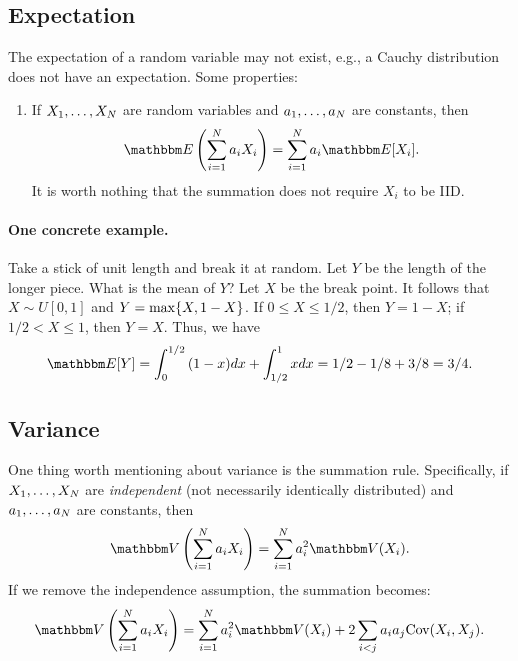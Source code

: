 \subsection{Expectation}
    The expectation of a random variable may not exist, e.g., a Cauchy distribution does not have an expectation. 
    Some properties:
        \begin{enumerate}
            \item If $X_1, \ldots, X_N$ are random variables and $a_1, \ldots, a_N$ are constants, then
                \begin{equation}
                    \E\left( \sum_{i=1}^{\ndata}{a_i X_i}\right) = \sum_{i=1}^{\ndata}{a_i \E[X_i]}.
                \end{equation}
            It is worth nothing that the summation does not require $X_i$ to be IID.
        \end{enumerate}
    \paragraph{One concrete example.} Take a stick of unit length and break it at random.
    Let $Y$ be the length of the longer piece. 
    What is the mean of $Y$?
    Let $X$ be the break point.
    It follows that $X \sim U[0, 1]$ and $Y = \max\{ X, 1- X \}$.
    If $0 \le X \le 1/2$, then $Y = 1 - X$; if $1/2 < X \le 1$, then $Y = X$.
    Thus, we have
        \begin{equation}
            \E{[Y]} = \int_{0}^{1/2}{(1-x) dx} + \int_{1/2}^{1}{x dx} = 1/2 - 1/8 + 3/8 = 3/4.
        \end{equation}
        
\subsection{Variance}
    One thing worth mentioning about variance is the summation rule.
    Specifically, if $X_1, \ldots, X_N$ are \emph{independent} (not necessarily identically distributed) and $a_1, \ldots, a_N$ are constants, then
        \begin{equation}
            \Var\left( \sum_{i=1}^{\ndata}{a_i X_i} \right) = \sum_{i=1}^{\ndata}{a_i^2 \Var(X_i)}.
        \end{equation}
    If we remove the independence assumption, the summation becomes:
        \begin{equation}
            \Var\left( \sum_{i=1}^{\ndata}{a_i X_i}\right) = \sum_{i=1}^{\ndata}{a_i^2 \Var(X_i)} + 2 \sum_{i < j}^{}{a_i a_j \Cov(X_i, X_j)}.
        \end{equation}
    
